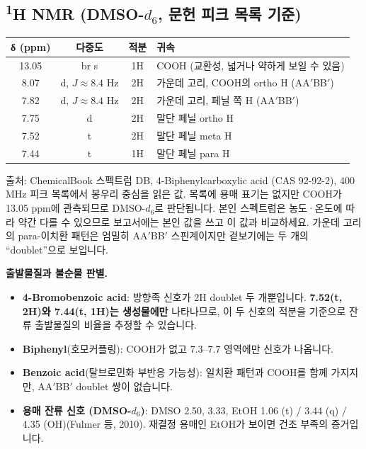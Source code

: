 \documentclass[10pt,a4paper]{article}
\begin{document}
\subsection*{\textsuperscript{1}H NMR (DMSO-$d_6$, 문헌 피크 목록 기준)}
\begin{center}
\renewcommand{\arraystretch}{1.15}
\begin{tabularx}{\linewidth}{|c|c|c|X|}
\hline
\textbf{δ (ppm)} & \textbf{다중도} & \textbf{적분} & \textbf{귀속} \\ \hline
13.05 & br s & 1H & COOH (교환성, 넓거나 약하게 보일 수 있음) \\ \hline
8.07 & d, $J\approx8.4$ Hz & 2H & 가운데 고리, COOH의 ortho H (AA$'$BB$'$) \\ \hline
7.82 & d, $J\approx8.4$ Hz & 2H & 가운데 고리, 페닐 쪽 H (AA$'$BB$'$) \\ \hline
7.75 & d & 2H & 말단 페닐 ortho H \\ \hline
7.52 & t & 2H & 말단 페닐 meta H \\ \hline
7.44 & t & 1H & 말단 페닐 para H \\ \hline
\end{tabularx}
\renewcommand{\arraystretch}{1}
\end{center}
{\small 출처: ChemicalBook 스펙트럼 DB, 4-Biphenylcarboxylic acid (CAS 92-92-2), 400 MHz 피크 목록에서 봉우리 중심을 읽은 값. 목록에 용매 표기는 없지만 COOH가 13.05 ppm에 관측되므로 DMSO-$d_6$로 판단됩니다. 본인 스펙트럼은 농도·온도에 따라 약간 다를 수 있으므로 보고서에는 본인 값을 쓰고 이 값과 비교하세요. 가운데 고리의 para-이치환 패턴은 엄밀히 AA$'$BB$'$ 스핀계이지만 겉보기에는 두 개의 ``doublet''으로 보입니다.}

\textbf{출발물질과 불순물 판별.}
\begin{itemize}[leftmargin=5mm,itemsep=0.5mm,topsep=0.5mm]
\item \textbf{4-Bromobenzoic acid}: 방향족 신호가 2H doublet 두 개뿐입니다. \textbf{7.52(t, 2H)와 7.44(t, 1H)는 생성물에만} 나타나므로, 이 두 신호의 적분을 기준으로 잔류 출발물질의 비율을 추정할 수 있습니다.
\item \textbf{Biphenyl}(호모커플링): COOH가 없고 7.3--7.7 영역에만 신호가 나옵니다.
\item \textbf{Benzoic acid}(탈브로민화 부반응 가능성): 일치환 패턴과 COOH를 함께 가지지만, AA$'$BB$'$ doublet 쌍이 없습니다.
\item \textbf{용매 잔류 신호 (DMSO-$d_6$)}: DMSO 2.50,  3.33, EtOH 1.06 (t) / 3.44 (q) / 4.35 (OH)(Fulmer 등, 2010). 재결정 용매인 EtOH가 보이면 건조 부족의 증거입니다.
\end{itemize}
\end{document}
